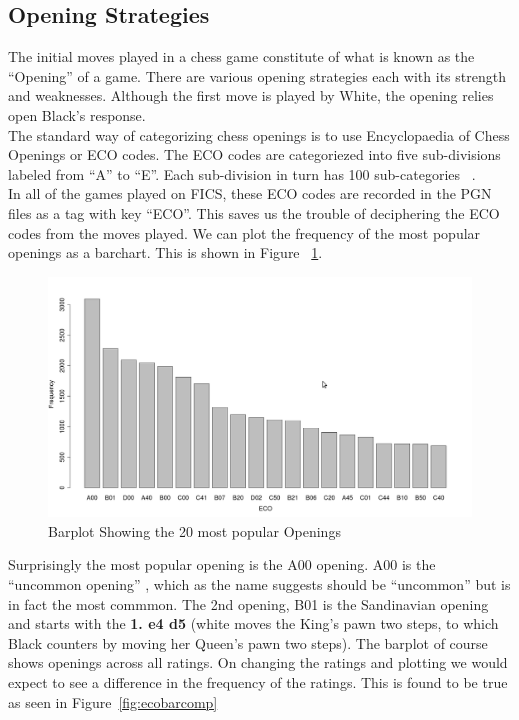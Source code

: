 \documentclass{article}
\begin{document}
\subsection{Opening Strategies}
The initial moves played in a chess game constitute of what is known as the ``Opening'' of a game. There are various opening strategies each with its strength and weaknesses. Although the first move is played by White, the opening relies open Black's response.\\

The standard way of categorizing chess openings is to use Encyclopaedia of Chess Openings or ECO codes. The ECO codes are categoriezed into five sub-divisions labeled from ``A'' to ``E''. Each sub-division in turn has 100 sub-categories ~\cite{wiki:eco}.\\

In all of the games played on FICS, these ECO codes are recorded in the PGN files as a tag with key ``ECO''. This saves us the trouble of deciphering the ECO codes from the moves played. We can plot the frequency of the most popular openings as a barchart. This is shown in Figure ~\ref{fig:ecobar}.

\begin{figure} [htp]
\begin{center}
\includegraphics[width=5in]{eco_bar.png}
\end{center}
\caption{Barplot Showing the 20 most popular Openings}
\label{fig:ecobar}
\end{figure}

Surprisingly the most popular opening is the A00 opening. A00 is the ``uncommon opening'' , which as the name suggests should be ``uncommon'' but is in fact the most commmon. The 2nd opening, B01 is the Sandinavian opening and starts with the {\bf 1. e4 d5} (white moves the King's pawn two steps, to which Black counters by moving her Queen's pawn two steps). The barplot of course shows openings across all ratings. On changing the ratings and plotting we would expect to see a difference in the frequency of the ratings. This is found to be true as seen in Figure~\ref{fig:ecobarcomp}
\end{document}
